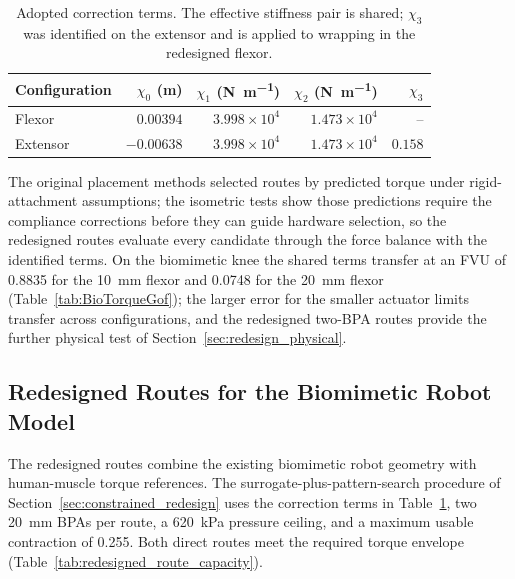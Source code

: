 \begin{table}[htbp]
\centering\small
\caption{Adopted correction terms. The effective stiffness pair is shared; $\chi_3$ was identified on the extensor and is applied to wrapping in the redesigned flexor.}
\label{tab:AdoptedXi}
\begin{tabular}{@{}lrrrr@{}}
\toprule
Configuration & $\chi_{0}$ (\unit{\meter}) & $\chi_{1}$ (\unit{\newton\per\meter}) & $\chi_{2}$ (\unit{\newton\per\meter}) & $\chi_{3}$\\
\midrule
Flexor & $0.00394$ & $3.998\times10^{4}$ & $1.473\times10^{4}$ & --\\
Extensor & $-0.00638$ & $3.998\times10^{4}$ & $1.473\times10^{4}$ & $0.158$\\
\bottomrule
\end{tabular}
\end{table}

The original placement methods selected routes by predicted torque under rigid-attachment assumptions; the isometric tests show those predictions require the compliance corrections before they can guide hardware selection, so the redesigned routes evaluate every candidate through the force balance with the identified terms. On the biomimetic knee the shared terms transfer at an FVU of 0.8835 for the \qty{10}{\mm} flexor and 0.0748 for the \qty{20}{\mm} flexor (Table~\ref{tab:BioTorqueGof}); the larger error for the smaller actuator limits transfer across configurations, and the redesigned two-BPA routes provide the further physical test of Section~\ref{sec:redesign_physical}.

\subsection{Redesigned Routes for the Biomimetic Robot Model}\label{sec:route_redesign_results}

The redesigned routes combine the existing biomimetic robot geometry with human-muscle torque references. The surrogate-plus-pattern-search procedure of Section~\ref{sec:constrained_redesign} uses the correction terms in Table~\ref{tab:AdoptedXi}, two \qty{20}{\mm} BPAs per route, a \qty{620}{\kPa} pressure ceiling, and a maximum usable contraction of 0.255. Both direct routes meet the required torque envelope (Table~\ref{tab:redesigned_route_capacity}).

